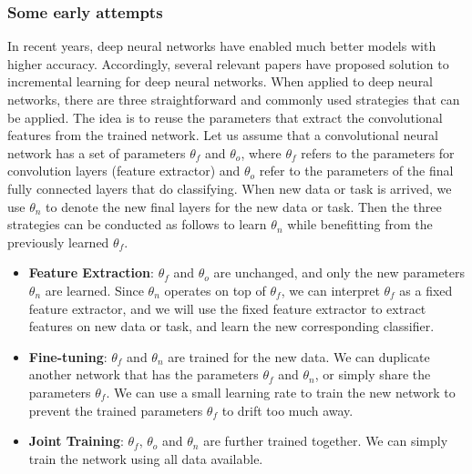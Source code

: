 \subsubsection{Some early attempts}
In recent years, deep neural networks have enabled much better models with higher accuracy. Accordingly, several relevant papers have proposed solution to incremental learning for deep neural networks. When applied to deep neural networks, there are three straightforward and commonly used strategies that can be applied. The idea is to reuse the parameters that extract the convolutional features from the trained network. Let us assume that a convolutional neural network has a set of parameters $\theta_f$ and $\theta_o$, where $\theta_f$ refers to the parameters for convolution layers (feature extractor) and $\theta_o$ refer to the parameters of the final fully connected layers that do classifying. When new data or task is arrived, we use $\theta_n$ to denote the new final layers for the new data or task. Then the three strategies can be conducted as follows to learn $\theta_n$ while benefitting from the previously learned $\theta_f$.
\begin{itemize}
	\item \textbf{Feature Extraction}: $\theta_f$ and $\theta_o$ are unchanged, and only the new parameters $\theta_n$ are learned. Since $\theta_n$ operates on top of $\theta_f$, we can interpret $\theta_f$ as a fixed feature extractor, and we will use the fixed feature extractor to extract features on new data or task, and learn the new corresponding classifier.
	\item \textbf{Fine-tuning}: $\theta_f$ and $\theta_n$ are trained for the new data. We can duplicate another network that has the parameters $\theta_f$ and $\theta_n$, or simply share the parameters $\theta_f$. We can use a small learning rate to train the new network to prevent the trained parameters $\theta_f$ to drift too much away.
	\item \textbf{Joint Training}: $\theta_f$, $\theta_o$ and $\theta_n$ are further trained together. We can simply train the network using all data available.
\end{itemize}

